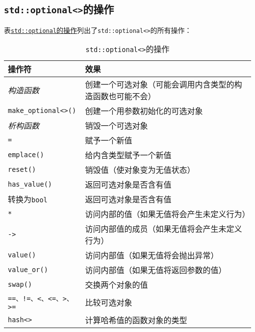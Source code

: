 \subsection{\texttt{std::optional<>}的操作}
表\hyperref[t15.1]{\texttt{std::optional}的操作}列出了\texttt{std::optional<>}的所有操作：
\begin{table}[htb]
    \centering
    \begin{tabular}{l|l}
        \hline
        \textbf{操作符}                & \textbf{效果}                   \\
        \hline
        \emph{构造函数}                 & 创建一个可选对象（可能会调用内含类型的构造函数也可能不会） \\
        \texttt{make\_optional<>()} & 创建一个用参数初始化的可选对象               \\
        \emph{析构函数}                 & 销毁一个可选对象                      \\
        \texttt{=}                  & 赋予一个新值                        \\
        \texttt{emplace()}          & 给内含类型赋予一个新值                   \\
        \texttt{reset()}            & 销毁值（使对象变为无值状态）                \\
        \texttt{has\_value()}       & 返回可选对象是否含有值                   \\
        转换为\texttt{bool}            & 返回可选对象是否含有值                   \\
        \texttt{*}                  & 访问内部的值（如果无值将会产生未定义行为）         \\
        \texttt{->}                 & 访问内部值的成员（如果无值将会产生未定义行为）       \\
        \texttt{value()}            & 访问内部值（如果无值将会抛出异常）             \\
        \texttt{value\_or()}        & 访问内部值（如果无值将返回参数的值）            \\
        \texttt{swap()}             & 交换两个对象的值                      \\
        \texttt{==、!=、<、<=、>、>=}    & 比较可选对象                        \\
        \texttt{hash<>}             & 计算哈希值的函数对象的类型                 \\
        \hline
    \end{tabular}
    \caption{\texttt{std::optional<>}的操作}
    \label{t15.1}
\end{table}

